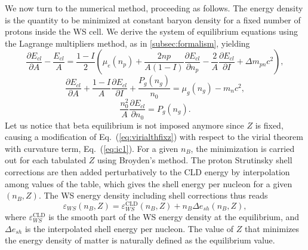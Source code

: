 We now turn to the numerical method, proceeding as follows. The energy density
is the quantity to be minimized at constant baryon density for a fixed number 
of protons inside the WS cell. We derive the system of equilibrium 
equations using the Lagrange multipliers method, as in \ref{subsec:formalism}, 
yielding
%
\begin{equation}
  \frac{\partial E_{cl}}{\partial A} - \frac{E_{cl}}{A} = \frac{1-I}{2}
  \left(\mu_e(n_p) +
  \frac{2np}{A(1-I)}\frac{\partial E_{cl}}{\partial n_p} 
  - \frac{2}{A}\frac{\partial E_{cl}}{\partial I} + \Delta
m_{pn}c^2\right),\label{eq:virialthfixz}
\end{equation}
\begin{equation}
  \frac{\partial E_{cl}}{\partial A} + \frac{1-I}{A}\frac{\partial
  E_{cl}}{\partial I} + \frac{P_g(n_g)}{n_0} = \mu_g(n_g) - m_nc^2,
\end{equation}
\begin{equation}
  \frac{n_0^2}{A}\frac{\partial E_{cl}}{\partial n_0} = P_g(n_g).
\end{equation}
%
Let us notice that beta equilibrium is not imposed anymore since $Z$ is fixed, 
causing a modification of Eq.~(\ref{eq:virialthfixz}) with respect to the virial 
theorem with curvature term, Eq.~(\ref{eq:ic1}). For a given $n_B$, the 
minimization is carried out for each tabulated $Z$ using Broyden's 
method. The proton Strutinsky shell corrections are then added perturbatively 
to the CLD energy by interpolation among values of the table, which gives the
shell energy per nucleon for a given $(n_B,Z)$. The WS energy density including
shell corrections thus reads
%
\begin{equation}
  \varepsilon_{WS}(n_B,Z) = \varepsilon_{WS}^{\text{CLD}}(n_B,Z) + n_B\Delta
  e_{sh}(n_B,Z),
\end{equation}
%
where $\varepsilon_{WS}^{\text{CLD}}$ is the smooth part of the WS energy density at the
equilibrium, and $\Delta e_{sh}$ is the interpolated shell energy per nucleon.
The value of $Z$ that minimizes the energy density of matter is naturally 
defined as the equilibrium value.

